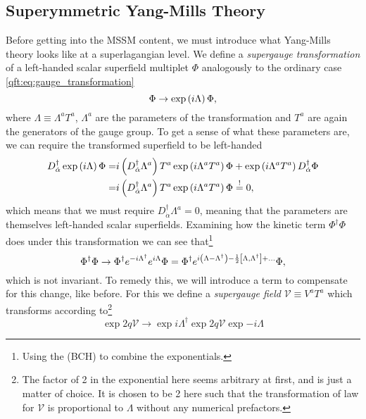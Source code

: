 \documentclass[../main.tex]{subfiles}
\begin{document}
\subsection{Superymmetric Yang-Mills Theory}
Before getting into the MSSM content, we must introduce what Yang-Mills theory
looks like at a superlagangian level. We define a \emph{supergauge
  transformation} of a left-handed scalar superfield multiplet \(\Phi\)
analogously to the ordinary case \cref{qft:eq:gauge_transformation}
\begin{equation}
  \label{susy:eq:supergauge_transformation}
  \Phi \to \operatorname{exp}\left(i \Lambda\right) \Phi,
\end{equation}
where \(\Lambda \equiv \Lambda^a T^a\), \(\Lambda^a\) are the parameters of the transformation and \(T^a\) are again the generators of the gauge group.
To get a sense of what these parameters are, we can require the transformed superfield to be left-handed
\begin{align*}
  D_{\dot{\alpha}}^\dagger \operatorname{exp}\left(i\Lambda\right) \Phi = & i\left(D_{\dot{\alpha}}^\dagger \Lambda^a\right) T^a \operatorname{exp}\left(i\Lambda^a T^a\right) \Phi + \operatorname{exp}\left(i\Lambda^a T^a\right) D_{\dot{\alpha}}^\dagger \Phi \\
  =                                                  & i\left(D_{\dot{\alpha}}^\dagger \Lambda^a\right) T^a \operatorname{exp}\left(i\Lambda^a T^a\right) \Phi \overset{!}{=} 0,
\end{align*}
which means that we must require \(D_{\dot{\alpha}}^\dagger \Lambda^a = 0\), meaning that the parameters are themselves left-handed scalar superfields.
Examining how the kinetic term \(\Phi^\dagger \Phi\) does under this transformation we can see that\footnote{Using the  (BCH) to combine the exponentials.}
\begin{equation}
  \Phi^\dagger \Phi \to \Phi^\dagger e^{-i\Lambda^\dagger} e^{i\Lambda} \Phi = \Phi^\dagger e^{i\left(\Lambda - \Lambda^\dagger\right) - \frac{1}{2} \left[\Lambda,\Lambda^\dagger\right] + \ldots} \Phi,
\end{equation}
which is not invariant.
To remedy this, we will introduce a term to compensate for this change, like before.
For this we define a   \emph{supergauge field} \(\mathcal{V} \equiv V^a T^a\) which transforms according to\footnote{The factor of 2 in the exponential here seems arbitrary at first, and is just a matter of choice. It is chosen to be 2 here such that the transformation of law for \(\mathcal{V}\) is proportional to \(\Lambda\) without any numerical prefactors.}
\begin{equation}
  \exp{2q\mathcal{V}} \to \exp{i\Lambda^\dagger} \exp{2q\mathcal{V}} \exp{-i\Lambda}
\end{equation}
\end{document}
